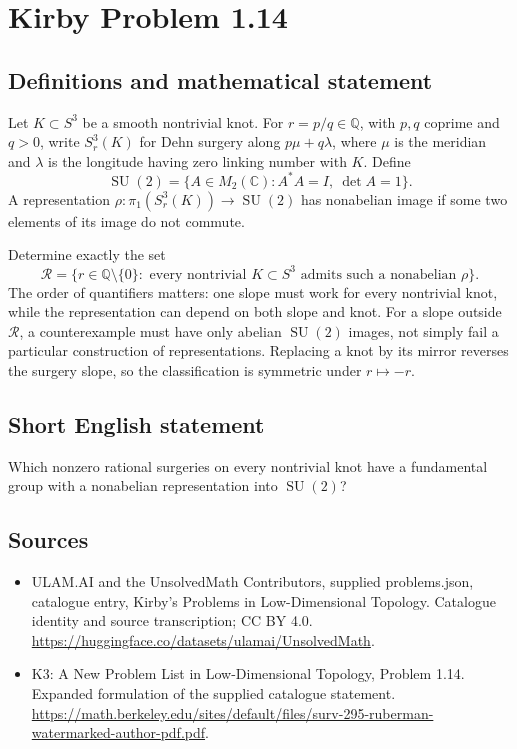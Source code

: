 \documentclass[11pt,a4paper]{article}
\begin{document}
\section*{Kirby Problem 1.14}\label{statement}

\subsection{Definitions and mathematical statement}
Let $K\subset S^3$ be a smooth nontrivial knot. For $r=p/q\in\mathbb Q$, with
$p,q$ coprime and $q>0$, write $S^3_r(K)$ for Dehn surgery along
$p\mu+q\lambda$, where $\mu$ is the meridian and $\lambda$ is the longitude
having zero linking number with $K$. Define
\[
\operatorname{SU}(2)=\{A\in M_2(\mathbb C):A^*A=I,\ \det A=1\}.
\]
A representation $\rho:\pi_1(S^3_r(K))\to\operatorname{SU}(2)$ has nonabelian
image if some two elements of its image do not commute.

Determine exactly the set
\[
\mathcal R=\{r\in\mathbb Q\setminus\{0\}:\text{ every nontrivial }K\subset S^3
\text{ admits such a nonabelian }\rho\}.
\]
The order of quantifiers matters: one slope must work for every nontrivial knot,
while the representation can depend on both slope and knot. For a slope outside
$\mathcal R$, a counterexample must have only abelian $\operatorname{SU}(2)$ images,
not simply fail a particular construction of representations. Replacing a knot
by its mirror reverses the surgery slope, so the classification is symmetric
under $r\mapsto-r$.
\subsection{Short English statement}
Which nonzero rational surgeries on every nontrivial knot have a fundamental group with a nonabelian representation into $\operatorname{SU}(2)$?
\subsection{Sources}
\begin{itemize}
\item[S1] ULAM.AI and the UnsolvedMath Contributors, supplied problems.json, catalogue entry, Kirby's Problems in Low-Dimensional Topology. Catalogue identity and source transcription; CC BY 4.0.
\url{https://huggingface.co/datasets/ulamai/UnsolvedMath}.
\item[S2] K3: A New Problem List in Low-Dimensional Topology, Problem 1.14. Expanded formulation of the supplied catalogue statement.
\url{https://math.berkeley.edu/sites/default/files/surv-295-ruberman-watermarked-author-pdf.pdf}.
\end{itemize}
\end{document}
